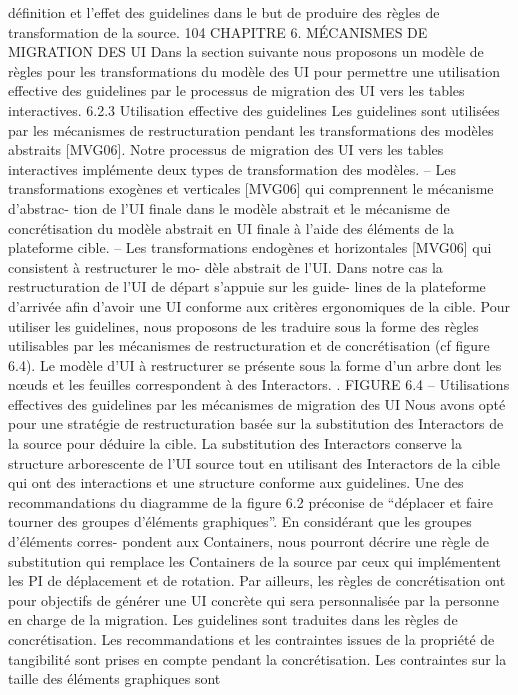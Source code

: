\documentclass{article}
\begin{document}
déﬁnition et l’effet des guidelines dans le but de produire des règles de transformation de la source.
104
CHAPITRE 6. MÉCANISMES DE MIGRATION DES UI
Dans la section suivante nous proposons un modèle de règles pour les transformations du modèle
des UI pour permettre une utilisation effective des guidelines par le processus de migration des UI
vers les tables interactives.
6.2.3
Utilisation effective des guidelines
Les guidelines sont utilisées par les mécanismes de restructuration pendant les transformations
des modèles abstraits [MVG06]. Notre processus de migration des UI vers les tables interactives
implémente deux types de transformation des modèles.
– Les transformations exogènes et verticales [MVG06] qui comprennent le mécanisme d’abstrac-
tion de l’UI ﬁnale dans le modèle abstrait et le mécanisme de concrétisation du modèle abstrait
en UI ﬁnale à l’aide des éléments de la plateforme cible.
– Les transformations endogènes et horizontales [MVG06] qui consistent à restructurer le mo-
dèle abstrait de l’UI. Dans notre cas la restructuration de l’UI de départ s’appuie sur les guide-
lines de la plateforme d’arrivée aﬁn d’avoir une UI conforme aux critères ergonomiques de la
cible.
Pour utiliser les guidelines, nous proposons de les traduire sous la forme des règles utilisables par
les mécanismes de restructuration et de concrétisation (cf ﬁgure 6.4). Le modèle d’UI à restructurer
se présente sous la forme d’un arbre dont les nœuds et les feuilles correspondent à des Interactors. .
FIGURE 6.4 – Utilisations effectives des guidelines par les mécanismes de migration des UI
Nous avons opté pour une stratégie de restructuration basée sur la substitution des Interactors de la
source pour déduire la cible. La substitution des Interactors conserve la structure arborescente de l’UI
source tout en utilisant des Interactors de la cible qui ont des interactions et une structure conforme
aux guidelines. Une des recommandations du diagramme de la ﬁgure 6.2 préconise de “déplacer et
faire tourner des groupes d’éléments graphiques”. En considérant que les groupes d’éléments corres-
pondent aux Containers, nous pourront décrire une règle de substitution qui remplace les Containers
de la source par ceux qui implémentent les PI de déplacement et de rotation.
Par ailleurs, les règles de concrétisation ont pour objectifs de générer une UI concrète qui sera
personnalisée par la personne en charge de la migration. Les guidelines sont traduites dans les règles
de concrétisation. Les recommandations et les contraintes issues de la propriété de tangibilité sont
prises en compte pendant la concrétisation. Les contraintes sur la taille des éléments graphiques sont
\end{document}
